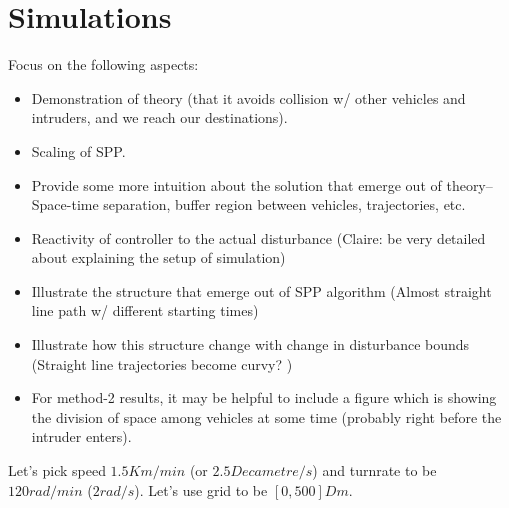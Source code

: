 \section{Simulations \label{sec:simulations}}

Focus on the following aspects:
\begin{itemize}
\item Demonstration of theory (that it avoids collision w/ other vehicles and intruders, and we reach our destinations).
\item Scaling of SPP.
\item Provide some more intuition about the solution that emerge out of theory-- Space-time separation, buffer region between vehicles, trajectories, etc.
\item Reactivity of controller to the actual disturbance (Claire: be very detailed about explaining the setup of simulation)
\item Illustrate the structure that emerge out of SPP algorithm (Almost straight line path w/ different starting times)
\item Illustrate how this structure change with change in disturbance bounds (Straight line trajectories become curvy? )
\item For method-2 results, it may be helpful to include a figure which is showing the division of space among vehicles at some time (probably right before the intruder enters).
\end{itemize}


Let's pick speed $1.5 Km/min$ (or $2.5 Decametre/s$) and turnrate to be $120 rad/min$ ($2 rad/s$). Let's use grid to be $[0, 500] Dm$.

